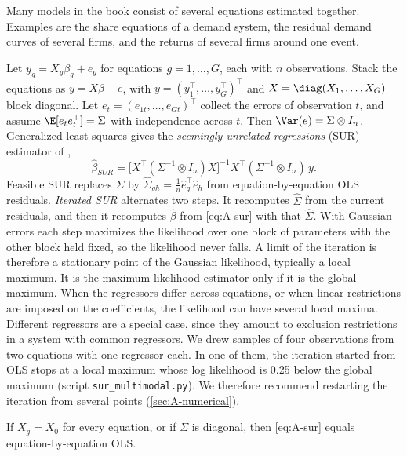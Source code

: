Many models in the book consist of several equations estimated together. Examples are the share
equations of a demand system, the residual demand curves of several firms, and the returns of several firms
around one event.

Let $y_g = X_g\beta_g + e_g$ for equations $g = 1, \dots, G$, each with $n$ observations. Stack the equations
as $y = X\beta + e$, with $y = (y_1^\top, \dots, y_G^\top)^\top$ and $X = \diag(X_1, \dots, X_G)$ block diagonal.
Let $e_t = (e_{1t}, \dots, e_{Gt})^\top$ collect the errors of observation $t$, and assume $\E[e_te_t^\top] = \Sigma$
with independence across $t$. Then $\Var(e) = \Sigma \otimes I_n$. Generalized least squares gives the
\emph{seemingly unrelated regressions} (SUR) estimator of \citet{Zellner1962},
\begin{equation}\label{eq:A-sur}
\hat\beta_{SUR} = \bigl[X^\top(\Sigma^{-1}\otimes I_n)X\bigr]^{-1}X^\top(\Sigma^{-1}\otimes I_n)\,y .
\end{equation}
Feasible SUR replaces $\Sigma$ by $\hat\Sigma_{gh} = \frac{1}{n}\hat e_g^\top\hat e_h$ from equation-by-equation OLS
residuals. \emph{Iterated SUR} alternates two steps. It recomputes $\hat\Sigma$ from the current residuals, and
then it recomputes $\hat\beta$ from \eqref{eq:A-sur} with that $\hat\Sigma$. With Gaussian errors each step
maximizes the likelihood over one block of parameters with the other block held fixed, so the likelihood never
falls. A limit of the iteration is therefore a stationary point of the Gaussian likelihood, typically a local
maximum. It is the maximum likelihood estimator only if it is the global maximum. When the regressors differ
across equations, or when linear restrictions are imposed on the coefficients, the likelihood can have several
local maxima. Different regressors are a special case, since they amount to exclusion restrictions in a system with
common regressors. We drew samples of four observations from two
equations with one regressor each. In one of them, the iteration started from OLS stops at a local maximum whose
log likelihood is 0.25 below the global maximum (script \texttt{sur\_multimodal.py}). We therefore recommend
restarting the iteration from several points (\cref{sec:A-numerical}).

\begin{proposition}\label{prop:A-sur-ols}
If $X_g = X_0$ for every equation, or if $\Sigma$ is diagonal, then \eqref{eq:A-sur} equals equation-by-equation
OLS.
\end{proposition}

